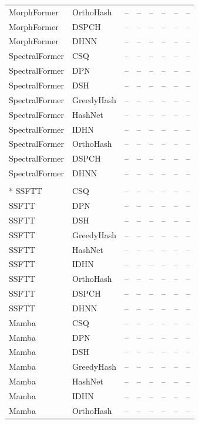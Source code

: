 \begin{longtable}{llrrrrrr}
MorphFormer & OrthoHash & -- & -- & -- & -- & -- & -- \\
MorphFormer & DSPCH & -- & -- & -- & -- & -- & -- \\
MorphFormer & DHNN & -- & -- & -- & -- & -- & -- \\
\addlinespace
SpectralFormer & CSQ & -- & -- & -- & -- & -- & -- \\
SpectralFormer & DPN & -- & -- & -- & -- & -- & -- \\
SpectralFormer & DSH & -- & -- & -- & -- & -- & -- \\
SpectralFormer & GreedyHash & -- & -- & -- & -- & -- & -- \\
SpectralFormer & HashNet & -- & -- & -- & -- & -- & -- \\
SpectralFormer & IDHN & -- & -- & -- & -- & -- & -- \\
SpectralFormer & OrthoHash & -- & -- & -- & -- & -- & -- \\
SpectralFormer & DSPCH & -- & -- & -- & -- & -- & -- \\
SpectralFormer & DHNN & -- & -- & -- & -- & -- & -- \\
\addlinespace
\multicolumn{8}{c}{\textbf{Trento}}\\*
\midrule
SSFTT & CSQ & -- & -- & -- & -- & -- & -- \\
SSFTT & DPN & -- & -- & -- & -- & -- & -- \\
SSFTT & DSH & -- & -- & -- & -- & -- & -- \\
SSFTT & GreedyHash & -- & -- & -- & -- & -- & -- \\
SSFTT & HashNet & -- & -- & -- & -- & -- & -- \\
SSFTT & IDHN & -- & -- & -- & -- & -- & -- \\
SSFTT & OrthoHash & -- & -- & -- & -- & -- & -- \\
SSFTT & DSPCH & -- & -- & -- & -- & -- & -- \\
SSFTT & DHNN & -- & -- & -- & -- & -- & -- \\
\addlinespace
Mamba & CSQ & -- & -- & -- & -- & -- & -- \\
Mamba & DPN & -- & -- & -- & -- & -- & -- \\
Mamba & DSH & -- & -- & -- & -- & -- & -- \\
Mamba & GreedyHash & -- & -- & -- & -- & -- & -- \\
Mamba & HashNet & -- & -- & -- & -- & -- & -- \\
Mamba & IDHN & -- & -- & -- & -- & -- & -- \\
Mamba & OrthoHash & -- & -- & -- & -- & -- & -- \\

\end{longtable}
